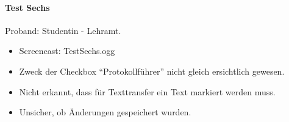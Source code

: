 \paragraph*{Test Sechs}
Proband: Studentin - Lehramt. 
\begin{itemize}
	\item Screencast: Test\textunderscore Sechs.ogg
	\item Zweck der Checkbox ``Protokollführer'' nicht gleich ersichtlich gewesen.  
	\item Nicht erkannt, dass für Texttransfer ein Text markiert werden muss.
	\item Unsicher, ob Änderungen gespeichert wurden.
\end{itemize}
